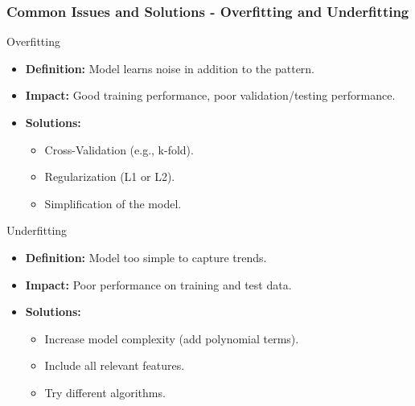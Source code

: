 \documentclass[aspectratio=169]{beamer}
\begin{document}
\begin{frame}[fragile]
    \frametitle{Common Issues and Solutions - Overfitting and Underfitting}
    \begin{block}{Overfitting}
        \begin{itemize}
            \item \textbf{Definition:} Model learns noise in addition to the pattern.
            \item \textbf{Impact:} Good training performance, poor validation/testing performance.
            \item \textbf{Solutions:}
            \begin{itemize}
                \item Cross-Validation (e.g., k-fold).
                \item Regularization (L1 or L2).
                \item Simplification of the model.
            \end{itemize}
        \end{itemize}
    \end{block}
    
    \begin{block}{Underfitting}
        \begin{itemize}
            \item \textbf{Definition:} Model too simple to capture trends.
            \item \textbf{Impact:} Poor performance on training and test data.
            \item \textbf{Solutions:}
            \begin{itemize}
                \item Increase model complexity (add polynomial terms).
                \item Include all relevant features.
                \item Try different algorithms.
            \end{itemize}
        \end{itemize}
    \end{block}
\end{frame}
\end{document}
